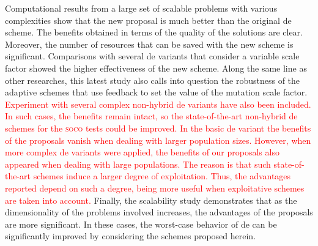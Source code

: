 \documentclass[review,3p]{elsarticle}
\newcommand{\DE}{{\sc de}}
\begin{document}
Computational results from a large set of scalable problems with various
complexities show that the new proposal is much better
than the original \DE{} scheme.
%
The benefits obtained in terms of the quality of the solutions are clear.
%
Moreover, the number of resources that can be saved with the new scheme is significant.
%
Comparisons with several \DE{} variants that consider a variable scale factor showed
the higher effectiveness of the new scheme.
%
Along the same line as other researches, this latest study also calls
into question the robustness of the adaptive schemes
that use feedback to set the value of the mutation scale factor.
%
\textcolor{red}{
Experiment with several complex non-hybrid \DE{} variants have also been included.
%
In such cases, the benefits remain intact, so the state-of-the-art non-hybrid \DE{} schemes
for the \textsc{soco} tests could be improved. 
%
In the basic \DE{} variant the benefits of the proposals vanish when dealing with larger population sizes.
%
However, when more complex \DE{} variants were applied, the benefits of our proposals also appeared when 
dealing with large populations.
%
The reason is that such state-of-the-art schemes induce a larger degree of exploitation.
%
Thus, the advantages reported depend on such a degree, being more useful when exploitative schemes
are taken into account.
}
%
%
%
Finally, the scalability study demonstrates that as the dimensionality of the problems involved increases, the
advantages of the proposals are more significant.
%
In these cases, the worst-case behavior of \DE{} can be significantly improved by considering the
schemes proposed herein.
\end{document}
